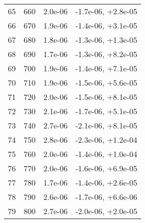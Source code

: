 \begin{table}
\begin{adjustbox}{width=1\textwidth/2}
\begin{tabular}{|c|c|c|c|}
\cline{1-4}
65 & 660 & 2.0e-06 & -1.7e-06, +2.8e-05 \\
\cline{1-4}
66 & 670 & 1.9e-06 & -1.4e-06, +3.1e-05 \\
\cline{1-4}
67 & 680 & 1.8e-06 & -1.3e-06, +1.3e-05 \\
\cline{1-4}
68 & 690 & 1.7e-06 & -1.3e-06, +8.2e-05 \\
\cline{1-4}
69 & 700 & 1.9e-06 & -1.4e-06, +7.1e-05 \\
\cline{1-4}
70 & 710 & 1.9e-06 & -1.5e-06, +5.6e-05 \\
\cline{1-4}
71 & 720 & 2.0e-06 & -1.5e-06, +8.1e-05 \\
\cline{1-4}
72 & 730 & 2.1e-06 & -1.7e-06, +5.1e-05 \\
\cline{1-4}
73 & 740 & 2.7e-06 & -2.1e-06, +8.1e-05 \\
\cline{1-4}
74 & 750 & 2.8e-06 & -2.3e-06, +1.2e-04 \\
\cline{1-4}
75 & 760 & 2.0e-06 & -1.4e-06, +1.0e-04 \\
\cline{1-4}
76 & 770 & 2.0e-06 & -1.6e-06, +6.9e-05 \\
\cline{1-4}
77 & 780 & 1.7e-06 & -1.4e-06, +2.6e-05 \\
\cline{1-4}
78 & 790 & 2.6e-06 & -1.7e-06, +6.6e-06 \\
\cline{1-4}
79 & 800 & 2.7e-06 & -2.0e-06, +2.0e-05 \\
\cline{1-4}
\end{tabular}
\end{adjustbox}
\end{table}

